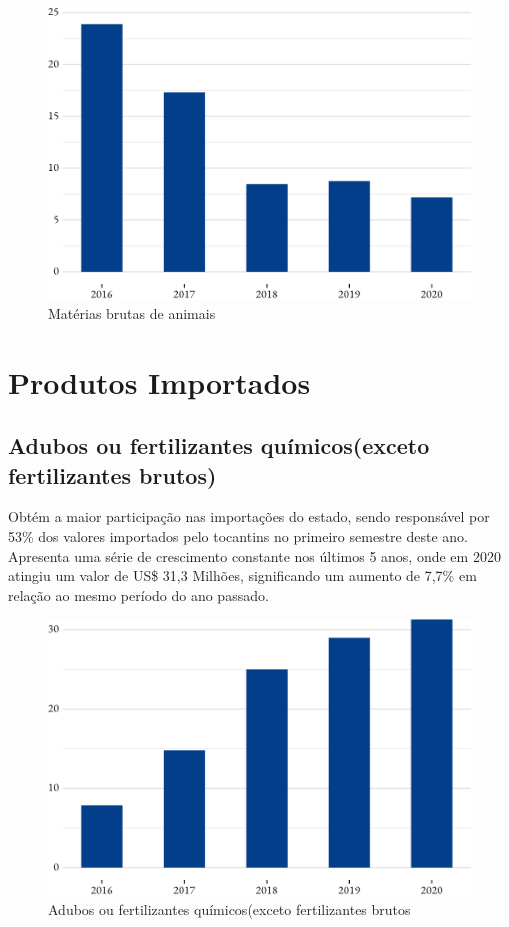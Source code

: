 \begin{figure}[h] 
	\caption{Matérias brutas de animais}
	\includegraphics{fig/ultimo-1.pdf}
\end{figure}

\section{Produtos Importados}

\subsection{Adubos ou fertilizantes químicos(exceto fertilizantes brutos)}
\par Obtém a maior participação nas importações do estado, sendo responsável por 53\% dos valores importados pelo tocantins no primeiro semestre deste ano. Apresenta uma série de crescimento constante nos últimos 5 anos, onde em 2020 atingiu um valor de US\$ 31,3 Milhões, significando um aumento de 7,7\% em relação ao mesmo período do ano passado.

\begin{figure}[h] 
	\caption{Adubos ou fertilizantes químicos(exceto fertilizantes brutos}
	\includegraphics{fig/adubos1-1.pdf}
\end{figure}

